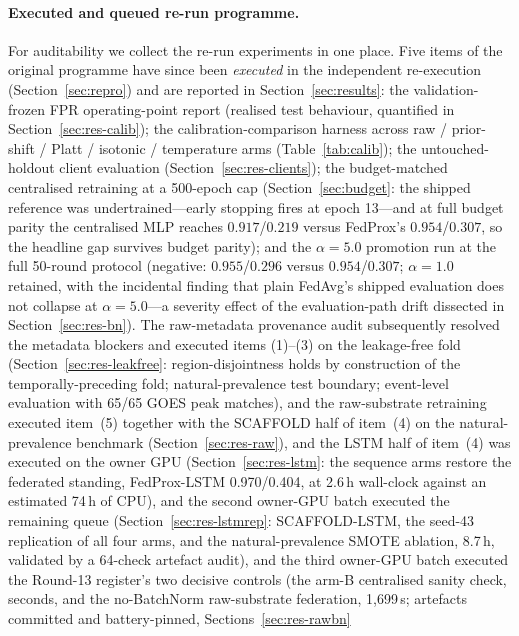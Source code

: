 \paragraph{Executed and queued re-run programme.}
For auditability we collect the re-run experiments in one place.
Five items of the original programme have since been \emph{executed}
in the independent re-execution (Section~\ref{sec:repro}) and are
reported in Section~\ref{sec:results}: the validation-frozen FPR
operating-point report (realised test behaviour, quantified in
Section~\ref{sec:res-calib}); the calibration-comparison harness
across raw / prior-shift / Platt / isotonic / temperature arms
(Table~\ref{tab:calib}); the untouched-holdout client evaluation
(Section~\ref{sec:res-clients}); the budget-matched centralised
retraining at a 500-epoch cap (Section~\ref{sec:budget}: the shipped
reference was undertrained---early stopping fires at epoch 13---and
at full budget parity the centralised MLP reaches $0.917$/$0.219$
versus FedProx's $0.954$/$0.307$, so the headline gap survives
budget parity); and the $\alpha{=}5.0$ promotion run at the full
50-round protocol (negative: $0.955$/$0.296$ versus $0.954$/$0.307$;
$\alpha{=}1.0$ retained, with the incidental finding that plain
FedAvg's shipped evaluation does not collapse at $\alpha{=}5.0$---a
severity effect of the evaluation-path drift dissected in
Section~\ref{sec:res-bn}). The
raw-metadata provenance audit subsequently resolved the metadata
blockers and executed items (1)--(3) on the leakage-free fold
(Section~\ref{sec:res-leakfree}: region-disjointness holds by
construction of the temporally-preceding fold; natural-prevalence
test boundary; event-level evaluation with 65/65 GOES peak
matches), and the raw-substrate retraining executed item~(5)
together with the SCAFFOLD half of item~(4) on the natural-prevalence
benchmark (Section~\ref{sec:res-raw}), and the LSTM half of
item~(4) was executed on the owner GPU (Section~\ref{sec:res-lstm}:
the sequence arms restore the federated standing, FedProx-LSTM
0.970/0.404, at 2.6\,h wall-clock against an estimated 74\,h of CPU),
and the second owner-GPU batch executed the remaining queue
(Section~\ref{sec:res-lstmrep}: SCAFFOLD-LSTM, the seed-43
replication of all four arms, and the natural-prevalence SMOTE
ablation, 8.7\,h, validated by a 64-check artefact audit), and the
third owner-GPU batch executed the Round-13 register's two decisive
controls (the arm-B centralised sanity check, seconds, and the
no-BatchNorm raw-substrate federation, 1{,}699\,s; artefacts
committed and battery-pinned, Sections~\ref{sec:res-rawbn}
